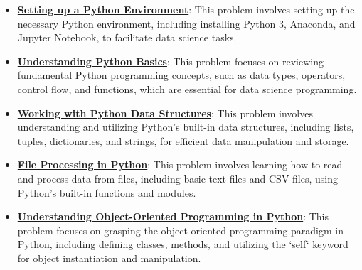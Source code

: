 \documentclass{article}%
\begin{document}
\begin{itemize}[leftmargin=*]%
\item \href{https://purdue.brightspace.com/d2l/common/assets/pdfjs-d2l-dist/1.0.14-legacy/web/viewer.html?file=\%2Fcontent\%2Fenforced\%2F1095465-WL.202510.CS24200.LE1\%2F02L1-python.pdf\%3Fou\%3D1095465\&lang=en-us\&container=d2l-fileviewer-rendered-pdf\&fullscreen=d2l-fileviewer-rendered-pdf-dialog\&height=667#page=3}{\textbf{Setting up a Python Environment}}: This problem involves setting up the necessary Python environment, including installing Python 3, Anaconda, and Jupyter Notebook, to facilitate data science tasks.%
\item \href{https://purdue.brightspace.com/d2l/common/assets/pdfjs-d2l-dist/1.0.14-legacy/web/viewer.html?file=\%2Fcontent\%2Fenforced\%2F1095465-WL.202510.CS24200.LE1\%2F02L1-python.pdf\%3Fou\%3D1095465\&lang=en-us\&container=d2l-fileviewer-rendered-pdf\&fullscreen=d2l-fileviewer-rendered-pdf-dialog\&height=667#page=6}{\textbf{Understanding Python Basics}}: This problem focuses on reviewing fundamental Python programming concepts, such as data types, operators, control flow, and functions, which are essential for data science programming.%
\item \href{https://purdue.brightspace.com/d2l/common/assets/pdfjs-d2l-dist/1.0.14-legacy/web/viewer.html?file=\%2Fcontent\%2Fenforced\%2F1095465-WL.202510.CS24200.LE1\%2F02L1-python.pdf\%3Fou\%3D1095465\&lang=en-us\&container=d2l-fileviewer-rendered-pdf\&fullscreen=d2l-fileviewer-rendered-pdf-dialog\&height=667#page=17}{\textbf{Working with Python Data Structures}}: This problem involves understanding and utilizing Python's built-in data structures, including lists, tuples, dictionaries, and strings, for efficient data manipulation and storage.%
\item \href{https://purdue.brightspace.com/d2l/common/assets/pdfjs-d2l-dist/1.0.14-legacy/web/viewer.html?file=\%2Fcontent\%2Fenforced\%2F1095465-WL.202510.CS24200.LE1\%2F02L1-python.pdf\%3Fou\%3D1095465\&lang=en-us\&container=d2l-fileviewer-rendered-pdf\&fullscreen=d2l-fileviewer-rendered-pdf-dialog\&height=667#page=46}{\textbf{File Processing in Python}}: This problem involves learning how to read and process data from files, including basic text files and CSV files, using Python's built-in functions and modules.%
\item \href{https://purdue.brightspace.com/d2l/common/assets/pdfjs-d2l-dist/1.0.14-legacy/web/viewer.html?file=\%2Fcontent\%2Fenforced\%2F1095465-WL.202510.CS24200.LE1\%2F02L1-python.pdf\%3Fou\%3D1095465\&lang=en-us\&container=d2l-fileviewer-rendered-pdf\&fullscreen=d2l-fileviewer-rendered-pdf-dialog\&height=667#page=43}{\textbf{Understanding Object{-}Oriented Programming in Python}}: This problem focuses on grasping the object-oriented programming paradigm in Python, including defining classes, methods, and utilizing the `self` keyword for object instantiation and manipulation.%
\end{itemize}%
\end{document}
